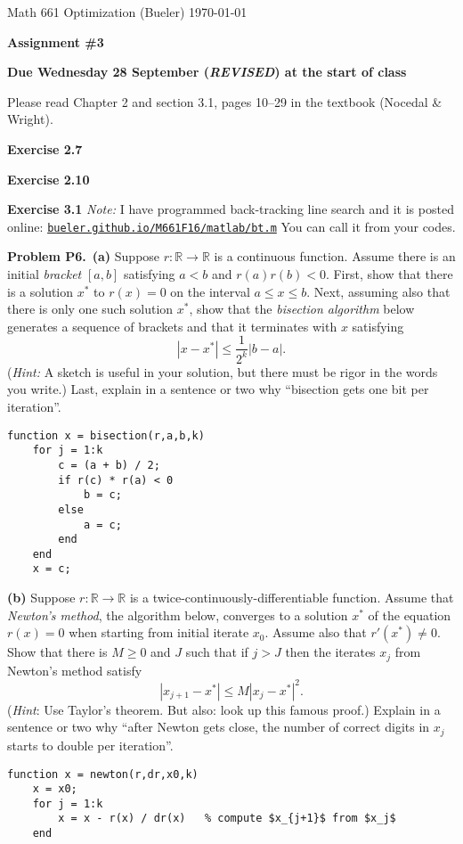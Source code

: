 \documentclass[12pt]{amsart}
\newcommand{\RR}{\mathbb{R}}
\newcommand{\prob}[1]{\medskip\noindent\textbf{#1}\quad }
\newcommand{\exer}[1]{\prob{Exercise #1}}
\newcommand{\epart}[1]{\medskip\noindent\textbf{(#1)}\quad }
\newcommand{\ppart}[1]{\,\textbf{(#1)}\quad }
\begin{document}
\scriptsize \noindent Math 661 Optimization (Bueler) \hfill \today
\normalsize

\medskip

\Large\centerline{\textbf{Assignment \#3}}
\large
\medskip

\centerline{\textbf{Due Wednesday 28 September (\emph{REVISED}) at the start of class}}

\normalsize

\thispagestyle{empty}

\medskip
\noindent Please read Chapter 2 and section 3.1, pages 10--29 in the textbook (Nocedal \& Wright).

\smallskip

\exer{2.7}

\exer{2.10}

\exer{3.1}   \emph{Note:}  I have programmed back-tracking line search and it is posted online:  \footnotesize \href{http://bueler.github.io/M661F16/matlab/bt.m}{\texttt{bueler.github.io/M661F16/matlab/bt.m}} \normalsize \quad  You can call it from your codes.

\prob{Problem P6.}  \ppart{a}  Suppose $r:\RR\to\RR$ is a continuous function.  Assume there is an initial \emph{bracket} $[a,b]$ satisfying $a<b$ and $r(a) r(b) < 0$.  First, show that there is a solution $x^*$ to $r(x)=0$ on the interval $a \le x \le b$.  Next, assuming also that there is only one such solution $x^*$, show that the \emph{bisection algorithm} below generates a sequence of brackets and that it terminates with $x$ satisfying
   $$|x - x^*| \le \frac{1}{2^k} |b-a|.$$
(\emph{Hint:}  A sketch is useful in your solution, but there must be rigor in the words you write.)  Last, explain in a sentence or two why ``bisection gets one bit per iteration''.

\bigskip

\scriptsize
\begin{lstlisting}[frame=single,tabsize=4]
function x = bisection(r,a,b,k)
	for j = 1:k
	    c = (a + b) / 2;
	    if r(c) * r(a) < 0
	        b = c;
	    else
	        a = c;
	    end
	end
	x = c;
\end{lstlisting}
\normalsize

\epart{b}  Suppose $r:\RR\to\RR$ is a twice-continuously-differentiable function.  Assume that \emph{Newton's method}, the algorithm below, converges to a solution $x^*$ of the equation $r(x)=0$ when starting from initial iterate $x_0$.  Assume also that $r'(x^*) \ne 0$.  Show that there is $M\ge 0$ and $J$ such that if $j>J$ then the iterates $x_j$ from Newton's method satisfy
    $$|x_{j+1} - x^*| \le M |x_j - x^*|^2.$$
(\emph{Hint}:  Use Taylor's theorem.  But also: look up this famous proof.)  Explain in a sentence or two why ``after Newton gets close, the number of correct digits in $x_j$ starts to double per iteration''.

\bigskip

\scriptsize
\begin{lstlisting}[frame=single,tabsize=4,mathescape]
function x = newton(r,dr,x0,k)
    x = x0;
	for j = 1:k
	    x = x - r(x) / dr(x)   % compute $x_{j+1}$ from $x_j$
	end
\end{lstlisting}
\normalsize
\end{document}
